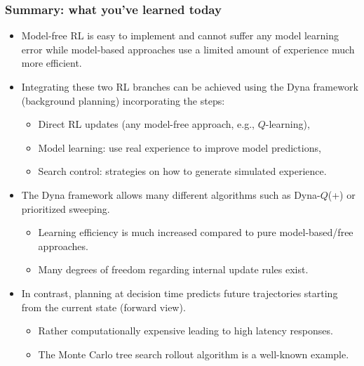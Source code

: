 \begin{frame}
  \frametitle{Summary: what you've learned today}
  \begin{itemize}
  \item Model-free RL is easy to implement and cannot suffer any model learning error while model-based approaches use a limited amount of experience much more efficient. \pause
  \item Integrating these two RL branches can be achieved using the Dyna framework (background planning) incorporating the steps:
    \begin{itemize}
    \item Direct RL updates (any model-free approach, e.g., $Q$-learning),
    \item Model learning: use real experience to improve model predictions,
    \item Search control: strategies on how to generate simulated experience. \pause
    \end{itemize}
  \item The Dyna framework allows many different algorithms such as Dyna-$Q$(+) or prioritized sweeping.
    \begin{itemize}
    \item Learning efficiency is much increased compared to pure model-based/free approaches.
    \item Many degrees of freedom regarding internal update rules exist.\pause
    \end{itemize}
  \item In contrast, planning at decision time predicts future trajectories starting from the current state (forward view).
    \begin{itemize}
    \item Rather computationally expensive leading to high latency responses.
    \item The Monte Carlo tree search rollout algorithm is a well-known example.
    \end{itemize}
  \end{itemize}
\end{frame}
